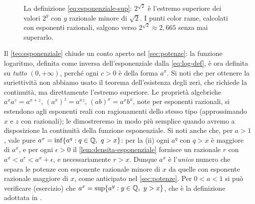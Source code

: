 \begin{figure}[htb]
\centering
{}
\caption{La definizione \eqref{eq:esponenziale-sup}: $2^{\sqrt2}$ è l'estremo superiore
dei valori $2^{y}$ con $y$ razionale minore di $\sqrt2$. I punti color rame,
calcolati con esponenti razionali, salgono verso $2^{\sqrt2}\approx2{,}665$ senza mai
superarlo.}
\label{fig:esponenziale-sup}
\end{figure}

\begin{osservazione}
Il \cref{teo:esponenziale} chiude un conto aperto nel \cref{sec:potenze}: la funzione
logaritmo, definita come inversa dell'esponenziale dalla \eqref{eq:log-def}, è ora definita su
\emph{tutto} $(0,+\infty)$, perché ogni $c>0$ è della forma $a^{x}$. Si noti che per
ottenere la suriettività non abbiamo usato il teorema dell'esistenza degli zeri, che
richiede la continuità, ma direttamente l'estremo superiore. Le proprietà algebriche
$a^{x}a^{z}=a^{x+z}$, $(a^{x})^{z}=a^{xz}$, $(ab)^{x}=a^{x}b^{x}$, note per esponenti
razionali, si estendono agli esponenti reali con ragionamenti dello stesso tipo
(approssimando $x$ e $z$ con razionali); le dimostreremo in modo più semplice quando
avremo a disposizione la continuità della funzione esponenziale. Si noti anche che,
per $a>1$, vale pure $a^{x}=\inf\{a^{q} : q\in\Q,\ q>x\}$: per la (ii) ogni $a^{q}$ con
$q>x$ è maggiore di $a^{x}$, e per ogni $\epsilon>0$ il \cref{lem:densita-esponenziale}
fornisce un razionale $r$ con $a^{x}<a^{r}<a^{x}+\epsilon$, e necessariamente $r>x$. Dunque
$a^{x}$ è l'\emph{unico} numero che separa le potenze con esponente razionale minore di
$x$ da quelle con esponente razionale maggiore di $x$, come anticipato nel
\cref{sec:potenze}. Per $0<a<1$ si può verificare (esercizio) che
$a^{x}=\sup\{a^{y} : y\in\mathbb{Q},\ y>x\}$, che è la definizione adottata in
\cite{marcellini-sbordone}.
\end{osservazione}


